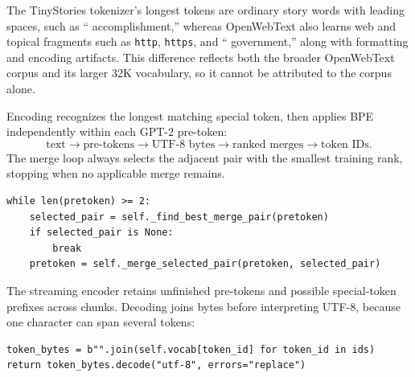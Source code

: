 
The TinyStories tokenizer's longest tokens are ordinary story words with leading spaces, such as `` accomplishment,'' 
whereas OpenWebText also learns web and topical fragments such as \texttt{http}, \texttt{https}, and `` government,'' along with formatting and encoding artifacts. 
This difference reflects both the broader OpenWebText corpus and its larger 32K vocabulary, so it cannot be attributed to the corpus alone.




Encoding recognizes the longest matching
special token, then applies BPE independently within each GPT-2 pre-token:
\[
\text{text}\longrightarrow\text{pre-tokens}
\longrightarrow\text{UTF-8 bytes}
\longrightarrow\text{ranked merges}\longrightarrow\text{token IDs}.
\]
The merge loop always selects the adjacent pair with the smallest training
rank, stopping when no applicable merge remains.
\par\noindent
\begin{minipage}{\linewidth}
\begin{lstlisting}[caption={BPE encoding within one pre-token}]
while len(pretoken) >= 2:
    selected_pair = self._find_best_merge_pair(pretoken)
    if selected_pair is None:
        break
    pretoken = self._merge_selected_pair(pretoken, selected_pair)
\end{lstlisting}
\end{minipage}\par
The streaming encoder retains unfinished pre-tokens and possible special-token
prefixes across chunks. Decoding joins bytes before interpreting UTF-8,
because one character can span several tokens:
\par\noindent
\begin{minipage}{\linewidth}
\begin{lstlisting}[caption={Byte-level decoding}]
token_bytes = b"".join(self.vocab[token_id] for token_id in ids)
return token_bytes.decode("utf-8", errors="replace")
\end{lstlisting}
\end{minipage}\par



